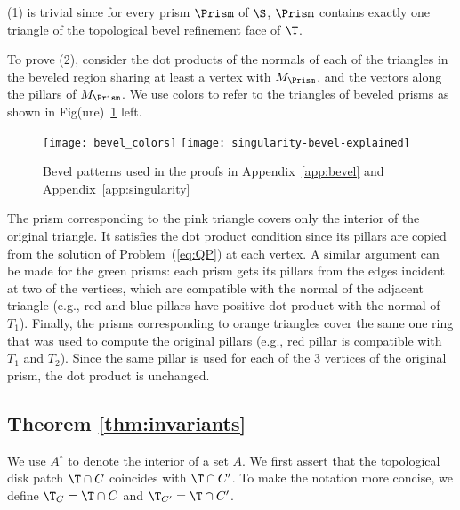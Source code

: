 (1) is trivial since for every prism $\Prism$ of $\S$, $\Prism$ contains exactly one {triangle of the topological bevel refinement} face of $\T$.%


To prove (2), consider the dot products of the normals of each of the triangles in the beveled region sharing at least a vertex with $M_\Prism$, and the vectors along the pillars of $M_\Prism$.
We use colors to refer to the triangles of beveled prisms as shown in Fig\remove(ure)~\ref{fig:bevel-explain} left. 


\begin{figure}
    \centering
    \texttt{[image: bevel\_colors]}
    \texttt{[image: singularity-bevel-explained]}
    \caption{Bevel patterns used in the proofs in Appendix~\ref{app:bevel} and Appendix~\ref{app:singularity}}
    
    \label{fig:bevel-explain}
    \vspace{-1em}
\end{figure}
The prism {corresponding to} the {pink} triangle covers only the interior of the original triangle. It satisfies {the dot product condition} since {its pillars are copied from the solution of Problem~(\ref{eq:QP})} at each vertex. 
A similar argument can be made for the green {prisms}: each  {prism} 
{gets its pillars from the edges}
incident at two of the vertices, {which are compatible with the normal of the adjacent triangle (e.g., red and blue pillars have positive dot product with  {the normal of} $T_1$).}
Finally, the prisms corresponding to orange triangles cover the same one ring that was used to compute the {original pillars (e.g., red pillar is compatible with $T_1$ and $T_2$)}. Since the same {pillar} is used for  each of the 3 vertices of the original prism, {the dot product} is {unchanged}.

\subsection{Theorem \ref{thm:invariants}}\label{app:invariant-checks}
We use $A^\circ$ to denote the interior of a set $A$. 
We first assert that the topological disk patch $\T \cap C$ coincides with $\T \cap C'$.
To make the notation more concise, we define $\T_C = \T \cap C$ and $\T_{C'} = \T \cap C'$.

